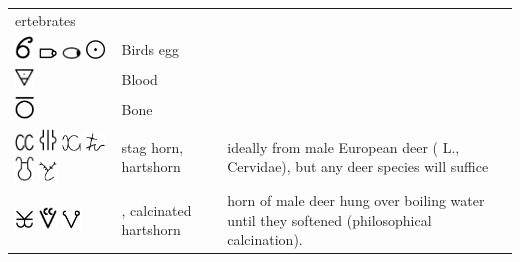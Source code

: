 \documentclass[british,final,landscape]{scrartcl}
\begin{document}
\begin{refsection}
\begin{supertabular}{p{0.3\textwidth}p{0.34\textwidth}p{0.34\textwidth}}
ertebrates \\
   \includegraphics[width=5mm]{Animal/BirdsEgg} \includegraphics[width=5mm]{Animal/BirdsEgg2} \includegraphics[width=5mm]{Animal/BirdsEgg3} \includegraphics[width=5mm]{Astrology/Sun} & Birds egg &  \\
   \includegraphics[width=5mm]{Animal/Blut} & Blood & \\
   \includegraphics[width=5mm]{Animal/Bone} & Bone & \\
   \includegraphics[width=5mm]{Animal/Hartshorn} \includegraphics[width=5mm]{Animal/Hartshorn2} \includegraphics[width=5mm]{Animal/Hartshorn3} \includegraphics[width=5mm]{Animal/Hartshorn4} \includegraphics[width=5mm]{Animal/Hartshorn5} \includegraphics[width=5mm]{Animal/Hartshorn6} &  stag horn, hartshorn & ideally from male European deer ( L., Cervidae), but any deer species will suffice \\
   \includegraphics[width=5mm]{Animal/CalcinatedHartshorn} \includegraphics[width=5mm]{Animal/CalcinatedHartshorn2} \includegraphics[width=5mm]{Animal/CalcinatedHartshorn3} & , calcinated hartshorn & horn of male deer hung over boiling water until they softened (philosophical calcination). \\

\end{supertabular}
\end{refsection}
\end{document}
